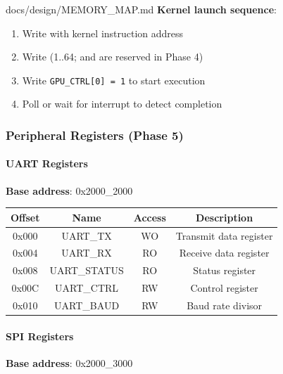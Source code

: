 \begin{relocated}{docs/design/MEMORY_MAP.md}
\textbf{Kernel launch sequence}:

\begin{enumerate}
\def\labelenumi{\arabic{enumi}.}
\tightlist
\item
  Write  with kernel instruction address
\item
  Write  (1..64;  and
   are reserved in Phase 4)
\item
  Write \texttt{GPU\_\allowbreak{}CTRL[0]\ =\allowbreak{}\ 1} to start
  execution
\item
  Poll  or wait for interrupt to detect completion
\end{enumerate}

\subsubsection{Peripheral Registers (Phase 5)}\label{ds:mm:memory-map:peripheral-registers-phase-5}

\paragraph{UART Registers}\label{ds:mm:memory-map:uart-registers}

\textbf{Base address}: 0x2000\_\allowbreak{}2000

{
\begin{longtable}[]{@{}cccc@{}}
\toprule\noalign{}
Offset & Name & Access & Description \\
\midrule\noalign{}
\endhead
\bottomrule\noalign{}
\endlastfoot
0x000 & UART\_TX & WO & Transmit data register \\
0x004 & UART\_RX & RO & Receive data register \\
0x008 & UART\_\allowbreak{}STATUS & RO & Status register \\
0x00C & UART\_CTRL & RW & Control register \\
0x010 & UART\_BAUD & RW & Baud rate divisor \\
\end{longtable}
}

\paragraph{SPI Registers}\label{ds:mm:memory-map:spi-registers}

\textbf{Base address}: 0x2000\_\allowbreak{}3000


\end{relocated}
